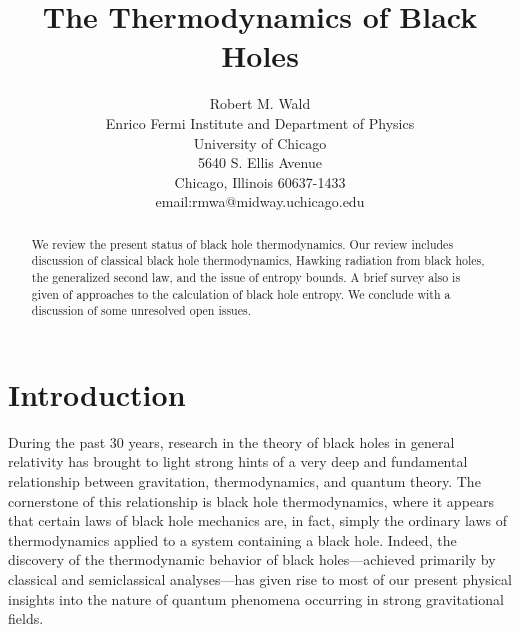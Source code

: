 \documentclass[12pt]{article}
\newcommand{\keywords}[1]{}
\begin{document}
\title{The Thermodynamics of Black Holes}

\author{Robert M. Wald\\
         Enrico Fermi Institute and Department of Physics\\
         University of Chicago\\
         5640 S. Ellis Avenue\\
         Chicago, Illinois 60637-1433\\
         email:rmwa@midway.uchicago.edu}
\date{}
\maketitle

\begin{abstract}

We review the present status of black hole thermodynamics. Our
review includes discussion of classical black hole thermodynamics,
Hawking radiation from black holes, the generalized second law, and
the issue of entropy bounds. A brief survey also is given of
approaches to the calculation of black hole entropy. We conclude with
a discussion of some unresolved open issues.

\end{abstract}

\keywords{black hole thermodynamics, black holes, event horizons,
Hawking radiation, quantum field theory, quantum gravity, Euclidean
methods, variational methods, statistical mechanics, thermodynamics,
Killing horizons, generalized second law, entropy bounds}

\newpage


\section{Introduction}
\label{section:intro}

During the past 30 years, research in the theory of black holes in
general relativity has brought to light strong hints of a very deep
and fundamental relationship between gravitation, thermodynamics, and
quantum theory. The cornerstone of this relationship is black hole
thermodynamics, where it appears that certain laws of black hole
mechanics are, in fact, simply the ordinary laws of thermodynamics
applied to a system containing a black hole. Indeed, the discovery of
the thermodynamic behavior of black holes---achieved primarily by
classical and semiclassical analyses---has given rise to most of our
present physical insights into the nature of quantum phenomena
occurring in strong gravitational fields.
\end{document}
